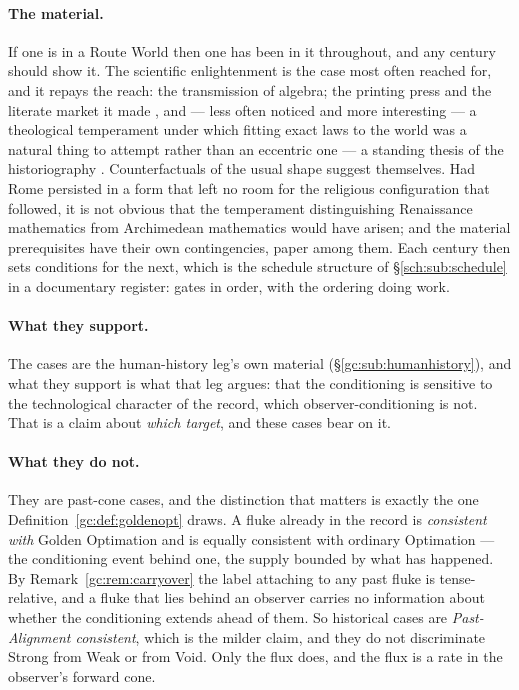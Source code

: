 \documentclass[11pt]{article}
\numberwithin{equation}{section}
\theoremstyle{plain}
\theoremstyle{definition}
\theoremstyle{remark}
\begin{document}
\paragraph{The material.} If one is in a Route World then one has been in
it throughout, and any century should show it. The scientific
enlightenment is the case most often reached for, and it repays the
reach: the transmission of algebra; the printing press and the literate
market it made \cite{Eisenstein79}, and --- less often noticed and more interesting --- a
theological temperament under which fitting exact laws to the world was
a natural thing to attempt rather than an eccentric one --- a standing
thesis of the historiography \cite{Merton38}. Counterfactuals
of the usual shape suggest themselves. Had Rome persisted in a form that
left no room for the religious configuration that followed, it is not
obvious that the temperament distinguishing Renaissance mathematics from
Archimedean mathematics would have arisen; and the material prerequisites
have their own contingencies, paper among them. Each century then sets
conditions for the next, which is the schedule structure of
\S\ref{sch:sub:schedule} in a documentary register: gates in order, with
the ordering doing work.

\paragraph{What they support.} The cases are the human-history leg's own
material (\S\ref{gc:sub:humanhistory}), and what they support is what
that leg argues: that the conditioning is sensitive to the technological
character of the record, which observer-conditioning is not. That is a
claim about \emph{which target}, and these cases bear on it.

\paragraph{What they do not.} They are past-cone cases, and the
distinction that matters is exactly the one
Definition~\ref{gc:def:goldenopt} draws. A fluke already in the record is
\emph{consistent with} Golden Optimation and is equally consistent with
ordinary Optimation --- the conditioning event behind one, the supply
bounded by what has happened. By Remark~\ref{gc:rem:carryover} the label
attaching to any past fluke is tense-relative, and a fluke that lies
behind an observer carries no information about whether the conditioning
extends ahead of them. So historical cases are \emph{Past-Alignment
consistent}, which is the milder claim, and they do not discriminate
Strong from Weak or from Void. Only the flux does, and the flux is a rate
in the observer's forward cone.
\end{document}
